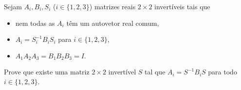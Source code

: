 Sejam \(A_{i},B_{i},S_{i}\) (\(i\in\{1,2,3\}\)) matrizes reais \(2\times 2\) invertíveis tais que
\begin{itemize}
	\item nem todas as \(A_{i}\) têm um autovetor real comum,
	\item \(A_{i}=S_{i}^{-1}B_{i}S_{i}\) para \(i\in\{1,2,3\}\),
	\item \(A_{1}A_{2}A_{3}=B_{1}B_{2}B_{3}=I\).
\end{itemize}
Prove que existe uma matriz \(2\times 2\) invertível \(S\) tal que \(A_{i}=S^{-1}B_{i}S\) para todo \(i\in\{1,2,3\}\).
